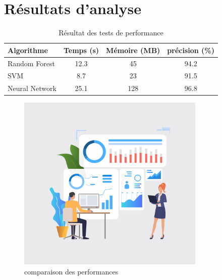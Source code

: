 \documentclass{article}
\begin{document}
	\section{Résultats d'analyse}
	\begin{table}[h]
		\centering
		\caption{Résultat des tests de performance}
		\begin{tabular}{lccc}
			\toprule
			Algorithme & Temps (s) & Mémoire (MB) & précision (\%) \\
			\midrule
			Random Forest & 12.3 & 45 & 94.2\\
			SVM  & 8.7 & 23 & 91.5\\
			Neural Network & 25.1 & 128 & 96.8 \\
			\bottomrule
		\end{tabular}
	\end{table}
	
	\begin{figure}[h]
		\centering
		\includegraphics[width=0.8\textwidth]{exemple-graphique.jpg}
		\caption{comparaison des performances}
	\end{figure}
		
\end{document}
